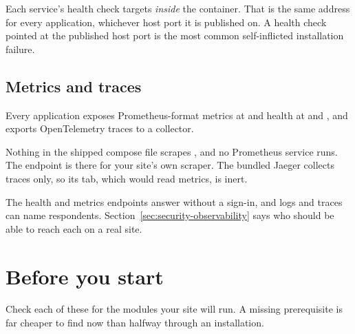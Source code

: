 \documentclass[11pt, a4paper]{article}
\begin{document}
\begin{elicitcaution}
Each service's health check targets  \emph{inside}
the container. That is the same address for every application, whichever host port it is
published on. A health check pointed at the published host port is the most common
self-inflicted installation failure.
\end{elicitcaution}

\subsection{Metrics and traces}

Every application exposes Prometheus-format metrics at  and health at
 and , and exports OpenTelemetry traces to a
collector.

\begin{elicitnote}
Nothing in the shipped compose file scrapes , and no Prometheus service runs.
The endpoint is there for your site's own scraper. The bundled Jaeger collects traces only, so
its  tab, which would read metrics, is inert.
\end{elicitnote}

The health and metrics endpoints answer without a sign-in, and logs and traces can name
respondents. Section~\ref{sec:security-observability} says who should be able to reach each on a
real site.

\section{Before you start}
\label{sec:before}

Check each of these for the modules your site will run. A missing prerequisite is far cheaper
to find now than halfway through an installation.
\end{document}
